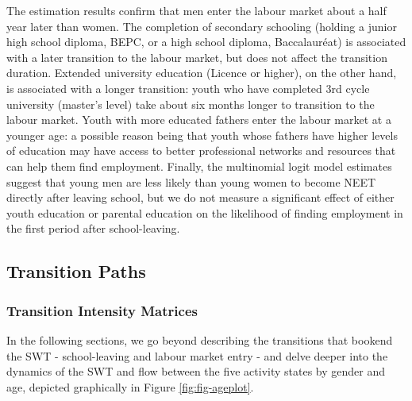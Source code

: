 \documentclass[
  a4paper, twoside, 12pt]{book}
\begin{document}
The estimation results confirm that men enter the labour market about a half year later than women. The completion of secondary schooling (holding a junior high school diploma, BEPC, or a high school diploma, Baccalauréat) is associated with a later transition to the labour market, but does not affect the transition duration. Extended university education (Licence or higher), on the other hand, is associated with a longer transition: youth who have completed 3rd cycle university (master's level) take about six months longer to transition to the labour market. Youth with more educated fathers enter the labour market at a younger age: a possible reason being that youth whose fathers have higher levels of education may have access to better professional networks and resources that can help them find employment. Finally, the multinomial logit model estimates suggest that young men are less likely than young women to become NEET directly after leaving school, but we do not measure a significant effect of either youth education or parental education on the likelihood of finding employment in the first period after school-leaving.

\hypertarget{survey-paths}{%
\subsection{Transition Paths}\label{survey-paths}}

\hypertarget{transition-intensity-matrices}{%
\subsubsection*{Transition Intensity Matrices}\label{transition-intensity-matrices}}

In the following sections, we go beyond describing the transitions that bookend the SWT - school-leaving and labour market entry - and delve deeper into the dynamics of the SWT and flow between the five activity states by gender and age, depicted graphically in Figure \ref{fig:fig-ageplot}.

\begin{singlespacing}

\end{singlespacing}
\end{document}
